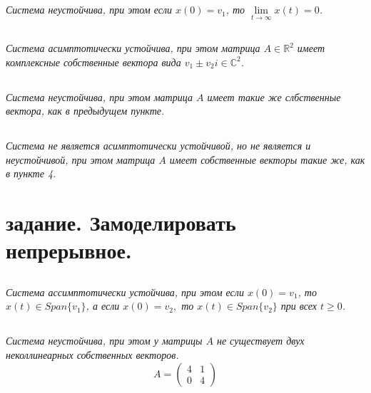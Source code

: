 \documentclass[a5paper, 10pt]{article}
\theoremstyle{definition}
\theoremstyle{plain}
\theoremstyle{remark}
\begin{document}
\subsection{}
\textit{Система неустойчива, при этом если $x(0) = v_1$, то $\lim\limits_{t \to \infty} x(t) = 0$.}


\subsection{}
\textit{Система асимптотически устойчива, при этом матрица $A \in \mathbb{R}^2$ имеет комплексные собственные вектора вида $v_1 \pm v_2 i \in \mathbb{C}^2$.}


\subsection{}
\textit{Система неустойчива, при этом матрица $A$ имеет такие же слбственные вектора, как в предыдущем пункте.}



\subsection{}
\textit{Система не является асимптотически устойчивой, но не является и неустойчивой, при этом матрица $A$ имеет собственные векторы такие же, как в пункте 4.}



\newpage
\section{задание. Замоделировать непрерывное.}

\subsection{}
\textit{Система ассимптотически устойчива, при этом если $x(0) = v_1$, то $x(t) \in Span\{v_1\}$, а если $x(0) = v_2,$ то  $x(t) \in Span\{v_2\}$ при всех $t \geq 0$.}


\subsection{}
\textit{Система неустойчива, при этом у матрицы $A$ не существует двух неколлинеарных собственных векторов.}
\begin{equation}
A=
\begin{pmatrix}
4 & 1\\
0 & 4
\end{pmatrix}
\end{equation}
\end{document}

